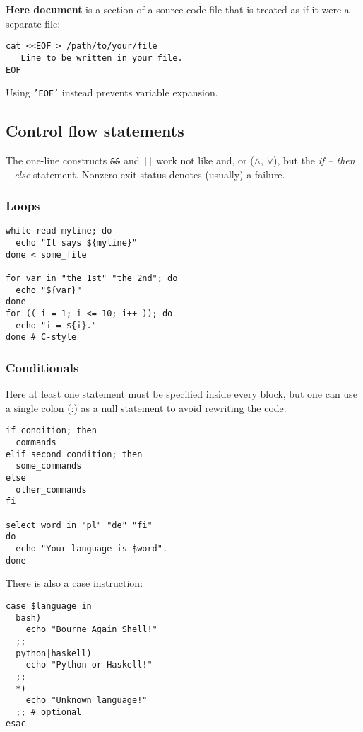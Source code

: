 \textbf{Here document} is a section of a source code file that is treated as if it were a separate file:

\begin{verbatim}
cat <<EOF > /path/to/your/file
   Line to be written in your file.
EOF
\end{verbatim}

Using \texttt{'EOF'} instead prevents variable expansion.

\subsection{Control flow statements}
The one-line constructs \texttt{\&\&} and \texttt{||} work not like and, or ($\wedge$, $\vee$), but the \emph{if -- then -- else} statement.
Nonzero exit status denotes (usually) a failure.

\subsubsection{Loops}
\begin{verbatim}
while read myline; do
  echo "It says ${myline}"
done < some_file

for var in "the 1st" "the 2nd"; do
  echo "${var}"
done
for (( i = 1; i <= 10; i++ )); do
  echo "i = ${i}."
done # C-style
\end{verbatim}
\subsubsection{Conditionals}
Here at least one statement must be specified inside every block,
but one can use a single colon (:) as a null statement to avoid
rewriting the code.

\begin{verbatim}
if condition; then
  commands
elif second_condition; then
  some_commands
else
  other_commands
fi

select word in "pl" "de" "fi"
do
  echo "Your language is $word".
done
\end{verbatim}

There is also a case instruction:
\begin{verbatim}
case $language in
  bash)
    echo "Bourne Again Shell!"
  ;;
  python|haskell)
    echo "Python or Haskell!"
  ;;
  *)
    echo "Unknown language!"
  ;; # optional
esac
\end{verbatim}

